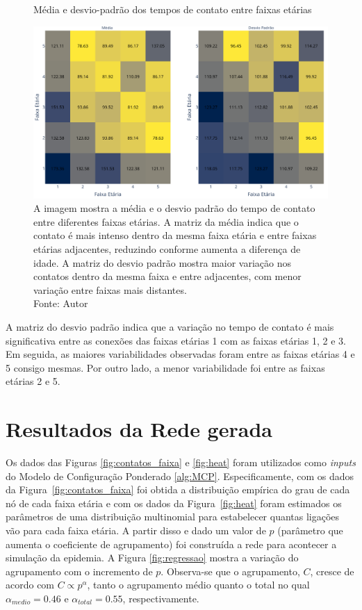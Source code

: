 \begin{figure}[H]
    \centering
    \captionsetup{font=normalsize,skip=0.8pt,singlelinecheck=on,labelsep=endash}
    \caption{Média e desvio-padrão dos tempos de contato entre faixas etárias}
    \includegraphics[scale= 0.32]{figuras/media_std.png}
    \captionsetup{font=small,justification=justified}
    \caption*{A imagem mostra a média e o desvio padrão do tempo de contato entre diferentes faixas etárias. A matriz da média indica que o contato é mais intenso dentro da mesma faixa etária e entre faixas etárias adjacentes, reduzindo conforme aumenta a diferença de idade. A matriz do desvio padrão mostra maior variação nos contatos dentro da mesma faixa e entre adjacentes, com menor variação entre faixas mais distantes. \\Fonte: Autor}
    \label{fig:mediastd}
\end{figure}
A matriz do desvio padrão indica que a variação no tempo de contato é mais significativa entre as conexões das faixas etárias 1 com as faixas etárias 1, 2 e 3. Em seguida, as maiores variabilidades observadas foram entre as faixas etárias 4 e 5 consigo mesmas. Por outro lado, a menor variabilidade foi entre as faixas etárias 2 e 5.

\section{Resultados da Rede gerada}

Os dados das Figuras \ref{fig:contatos_faixa} e \ref{fig:heat} foram utilizados como \textit{inputs} do Modelo de Configuração Ponderado \ref{alg:MCP}. Especificamente, com os dados da Figura~\ref{fig:contatos_faixa} foi obtida a distribuição empírica do grau de cada nó de cada faixa etária e com os dados da Figura~\ref{fig:heat} foram estimados os parâmetros de uma distribuição multinomial para estabelecer quantas ligações vão para cada faixa etária. A partir disso e dado um valor de $p$ (parâmetro que aumenta o coeficiente de agrupamento) foi construída a rede para acontecer a simulação da epidemia. 
A Figura \ref{fig:regressao} mostra a variação do
agrupamento com o incremento de $p$. Observa-se que o agrupamento, $C$, cresce de acordo com $C \propto p^{\alpha}$, tanto o agrupamento médio quanto o total no qual $\alpha_{medio } = 0.46$ e $\alpha_{total } = 0.55$, respectivamente. 

